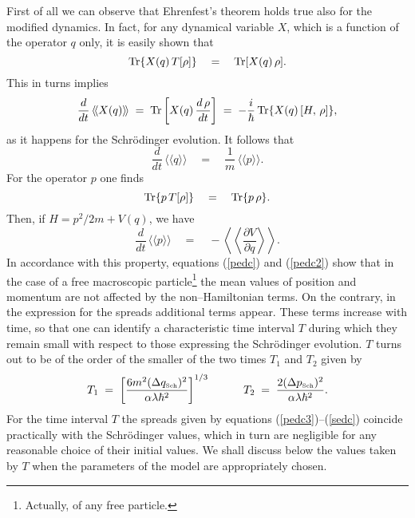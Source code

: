 \documentclass[10pt,a4paper]{article}
\newcommand{\llangle}{\langle\!\langle}
\newcommand{\rrangle}{\rangle\!\rangle}
\newcommand{\LLangle}{\left\langle\!\!\!\left\langle}
\newcommand{\RRangle}{\right\rangle\!\!\!\right\rangle}
\begin{document}
First of all we can observe that Ehrenfest's theorem holds true
also for the modified dynamics. In fact, for any dynamical
variable $X$, which is a function of the operator $q$ only, it is
easily shown that
\begin{equation}
\makebox{Tr} \{ X(q)\,T[\rho]\} \quad = \quad \makebox{Tr}[X(q)\,
\rho].
\end{equation}
This in turns implies
\begin{equation}
\frac{d}{dt}\, \llangle X(q) \rrangle \; = \; \makebox{Tr} \left[
X(q)\, \frac{d\,\rho}{dt} \right] \; = \; - \frac{i}{\hbar} \,
\makebox{Tr} \{ X(q)\, [ H,\, \rho]\},
\end{equation}
as it happens for the Schr\"odinger evolution. It follows that
\begin{equation} \frac{d}{dt}\, \llangle q \rrangle \quad = \quad
\frac{1}{m}\, \llangle p \rrangle.
\end{equation}
For the operator $p$ one finds
\begin{equation}
\makebox{Tr} \{ p\, T[\rho]\} \quad = \quad \makebox{Tr} \{ p\,
\rho\}.
\end{equation}
Then, if $H = p^{2}/2m + V(q)$, we have
\begin{equation}
\frac{d}{dt}\, \llangle p \rrangle \quad = \quad - \LLangle
\frac{\partial V}{\partial q} \RRangle.
\end{equation}
In accordance with this property, equations (\ref{pedc}) and
(\ref{pedc2}) show that in the case of a free macroscopic
particle\footnote{Actually, of any free particle.} the mean values
of position and momentum are not affected by the non--Hamiltonian
terms. On the contrary, in the expression for the spreads
additional terms appear. These terms increase with time, so that
one can identify a characteristic time interval $T$ during which
they remain small with respect to those expressing the
Schr\"odinger evolution. $T$ turns out to be of the order of the
smaller of the two times $T_{1}$ and $T_{2}$ given by
\begin{equation} \label{nlhadun}
T_{1} \; = \; \left[\frac{6m^{2}(\Delta q_{\makebox{\tiny
Sch}})^{2}}{\alpha\lambda\hbar^{2}} \right]^{1/3} \qquad \quad
T_{2} \; = \; \frac{2(\Delta p_{\makebox{\tiny Sch}})^{2}}{\alpha
\lambda\hbar^{2}}.
\end{equation}
For the time interval $T$ the spreads given by equations
(\ref{pedc3})--(\ref{sedc}) coincide practically with the
Schr\"odinger values, which in turn are negligible for any
reasonable choice of their initial values. We shall discuss below
the values taken by $T$ when the parameters of the model are
appropriately chosen.
\end{document}
